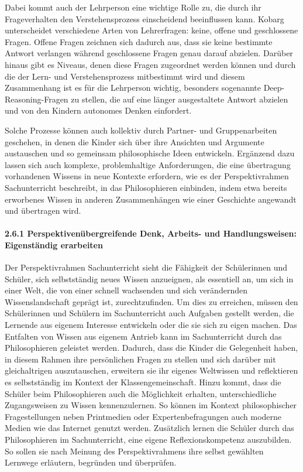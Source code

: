 Dabei kommt auch der Lehrperson eine wichtige Rolle zu, die durch ihr Frageverhalten den Verstehensprozess einscheidend beeinflussen kann. 
Kobarg unterscheidet verschiedene Arten von Lehrerfragen: keine, offene und geschlossene Fragen. 
Offene Fragen zeichnen sich dadurch aus, dass sie keine bestimmte Antwort verlangen während geschlossene Fragen genau darauf abzielen. 
Darüber hinaus gibt es Niveaus, denen diese Fragen zugeordnet werden können\cite{HB15, S.22} und durch die der Lern- und Verstehensprozess mitbestimmt wird und diesem Zusammenhang ist es für die Lehrperson wichtig, besonders sogenannte \glqq Deep-Reasoning\grqq{}-Fragen zu stellen, die auf eine länger ausgestaltete Antwort abzielen und von den Kindern autonomes Denken einfordert. 

Solche Prozesse können auch kollektiv durch Partner- und Gruppenarbeiten geschehen, in denen die Kinder sich über ihre Ansichten und Argumente austauschen und so gemeinsam philosophische Ideen entwickeln. 
Ergänzend dazu lassen sich auch \glqq komplexe, problemhaltige Anforderungen, die eine übertragung vorhandenen Wissens in neue Kontexte erfordern\grqq{}\cite{GDS13, S.21}, wie es der Perspektivrahmen Sachunterricht beschreibt, in das Philosophieren einbinden, indem etwa bereits erworbenes Wissen in anderen Zusammenhängen wie einer Geschichte angewandt und übertragen wird. 

\newpage

\paragraph{ 2.6.1 Perspektivenübergreifende Denk, Arbeits- und Handlungsweisen: Eigenständig erarbeiten}


Der Perspektivrahmen Sachunterricht sieht die Fähigkeit der Schülerinnen und Schüler, sich selbstständig neues Wissen anzueignen, als essentiell an, um sich in einer Welt, die von einer schnell wachsenden und sich verändernden Wissenslandschaft geprägt ist, zurechtzufinden. 
Um dies zu erreichen, müssen den Schülerinnen und Schülern im Sachunterricht auch Aufgaben gestellt werden, \glqq die Lernende aus eigenem Interesse entwickeln oder die sie sich zu eigen machen.\grqq{}\cite{GDS13, S.22}
Das Entfalten von Wissen aus eigenem Antrieb kann im Sachunterricht durch das Philosophieren geleistet werden. 
Dadurch, dass die Kinder die Gelegenheit haben, in diesem Rahmen ihre persönlichen Fragen zu stellen und sich darüber mit gleichaltrigen auszutauschen, erweitern sie ihr eigenes Weltwissen und reflektieren es selbstständig im Kontext der Klassengemeinschaft. 
Hinzu kommt, dass die Schüler beim Philosophieren auch die Möglichkeit erhalten, unterschiedliche Zugangsweisen zu Wissen kennenzulernen. 
So können im Kontext philosophischer Fragestellungen neben Printmedien oder Expertenbefragungen auch moderne Medien wie das Internet genutzt werden.
Zusätzlich lernen die Schüler durch das Philosophieren im Sachunterricht, eine eigene Reflexionskompetenz auszubilden. 
So sollen sie nach Meinung des Perspektivrahmens \glqq ihre selbst gewählten Lernwege erläutern, begründen und überprüfen.\grqq{}\cite{GDS13, S.23}


